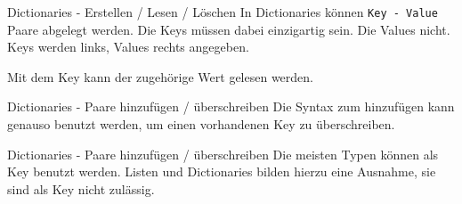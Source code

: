 \begin{frame}{Dictionaries - Erstellen / Lesen / Löschen}
	In Dictionaries können \alert{\texttt{Key - Value}} Paare abgelegt werden.
	\linebreak
	Die Keys müssen dabei einzigartig sein. Die Values nicht.
	\linebreak
	Keys werden links, Values rechts angegeben.
	
	\pause
	Mit dem Key kann der zugehörige Wert gelesen werden.
	
\end{frame}

\begin{frame}{Dictionaries - Paare hinzufügen / überschreiben}
	Die Syntax zum hinzufügen kann genauso benutzt werden, um einen vorhandenen Key zu überschreiben.
	
	
\end{frame}

\begin{frame}{Dictionaries - Paare hinzufügen / überschreiben}
	Die meisten Typen können als Key benutzt werden. Listen und Dictionaries bilden hierzu eine Ausnahme, sie sind als Key nicht zulässig.
	
\end{frame}


